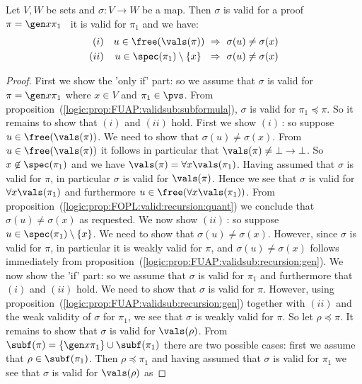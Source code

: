 \begin{prop}\label{logic:prop:FUAP:strongvalidsub:recursion:gen}
Let $V, W$ be sets and $\sigma:V\to W$ be a map. Then $\sigma$ is
valid for a proof $\pi=\gen x\pi_{1}$ \ifand\ it is valid for
$\pi_{1}$ and we have:
    \begin{eqnarray*}
    (i)&&u\in\free(\vals(\pi))\ \Rightarrow\ \sigma(u)\neq\sigma(x)\\
    (ii)&&u\in\spec(\pi_{1})\setminus\{x\}\ \ \Rightarrow\
    \sigma(u)\neq\sigma(x)
    \end{eqnarray*}
\end{prop}
\begin{proof}
First we show the 'only if' part: so we assume that $\sigma$ is
valid for $\pi=\gen x\pi_{1}$ where $x\in V$ and $\pi_{1}\in\pvs$.
From proposition~(\ref{logic:prop:FUAP:validsub:subformula}),
$\sigma$ is valid for $\pi_{1}\preceq\pi$. So it remains to show
that $(i)$ and $(ii)$ hold. First we show $(i)$\,: so suppose
$u\in\free(\vals(\pi))$. We need to show that
$\sigma(u)\neq\sigma(x)$. From $u\in\free(\vals(\pi))$ it follows in
particular that $\vals(\pi)\neq\bot\to\bot$. So
$x\not\in\spec(\pi_{1})$ and we have $\vals(\pi)=\forall
x\vals(\pi_{1})$. Having assumed that $\sigma$ is valid for $\pi$,
in particular $\sigma$ is valid for $\vals(\pi)$. Hence we see that
$\sigma$ is valid for $\forall x\vals(\pi_{1})$ and furthermore
$u\in\free(\forall x\vals(\pi_{1}))$. From
proposition~(\ref{logic:prop:FOPL:valid:recursion:quant}) we
conclude that $\sigma(u)\neq\sigma(x)$ as requested. We now show
$(ii)$\,: so suppose $u\in\spec(\pi_{1})\setminus\{x\}$. We need to
show that $\sigma(u)\neq\sigma(x)$. However, since $\sigma$ is valid
for $\pi$, in particular it is weakly valid for $\pi$, and
$\sigma(u)\neq\sigma(x)$ follows immediately from
proposition~(\ref{logic:prop:FUAP:validsub:recursion:gen}). We now
show the 'if' part: so we assume that $\sigma$ is valid for
$\pi_{1}$ and furthermore that $(i)$ and $(ii)$ hold. We need to
show that $\sigma$ is valid for $\pi$. However, using
proposition~(\ref{logic:prop:FUAP:validsub:recursion:gen}) together
with $(ii)$ and the weak validity of $\sigma$ for $\pi_{1}$, we see
that $\sigma$ is weakly valid for $\pi$. So let $\rho\preceq\pi$. It
remains to show that $\sigma$ is valid for $\vals(\rho)$. From
$\subf(\pi)=\{\gen x\pi_{1}\}\cup\subf(\pi_{1})$ there are two
possible cases: first we assume that $\rho\in\subf(\pi_{1})$. Then
$\rho\preceq\pi_{1}$ and having assumed that $\sigma$ is valid for
$\pi_{1}$ we see that $\sigma$ is valid for $\vals(\rho)$ as

\end{proof}
